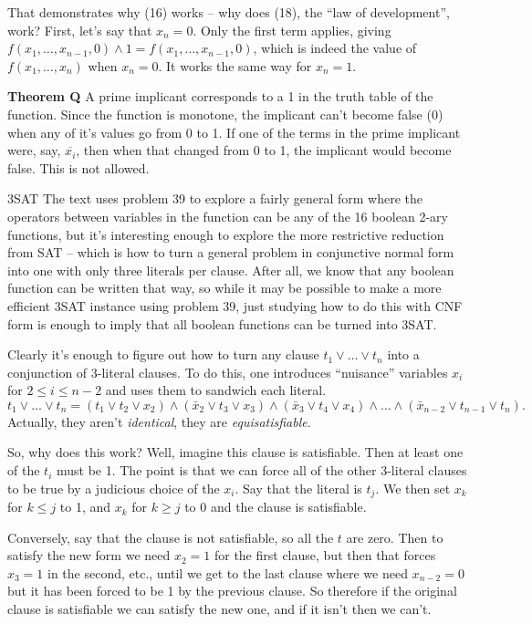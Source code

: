  That demonstrates why (16) works -- why does (18), 
the ``law of development'', work?\hfil\break
First, let's say that $x_n = 0$.  Only the first term applies, giving
$f\left(x_1,\ldots,x_{n-1},0\right) \wedge 1 = f\left(x_1,\ldots,x_{n-1},0\right)$,
which is indeed the value of $f\left( x_1,\ldots,x_n \right)$ when $x_n = 0$.
It works the same way for $x_n = 1$.

 {\bf Theorem Q}\hfil\break 
A prime implicant corresponds to a 1 in the
truth table of the function.  Since the function is monotone, the implicant
can't become false (0) when any of it's values go from 0 to 1.  If one
of the terms in the prime implicant were, say, $\overline{x_i}$, then
when that changed from 0 to 1, the implicant would become false.  This
is not allowed.


\noindent [p56] 3SAT\hfil\break
The text uses problem 39 to explore a fairly general form where the 
operators between variables
in the function can be any of the 16 boolean 2-ary functions, but it's
interesting enough to explore the more restrictive reduction from SAT --
which is how to turn a general problem in conjunctive normal form
into one with only three literals per clause.  After all, we know that
any boolean function can be written that way, so while it may be
possible to make a more efficient 3SAT instance using problem 39,
just studying how to do this with CNF form is enough to imply that
all boolean functions can be turned into 3SAT.

Clearly it's enough to figure out how to turn any clause $t_1 \vee \ldots
\vee t_n$ into a conjunction of 3-literal clauses.  To do this, one introduces
``nuisance'' variables $x_i$ for $2 \leq i \leq n - 2$ and uses them to sandwich
each literal.
$$
t_1 \vee \ldots \vee t_n = \left(t_1 \vee t_2 \vee x_2\right)
\land \left(\bar x_2 \vee t_3 \vee x_3\right)
\land \left(\bar x_3 \vee t_4 \vee x_4\right)
\land \ldots \land \left(\bar x_{n-2} \vee t_{n-1} \vee t_n\right) .
$$
Actually, they aren't {\it identical}, they are {\it equisatisfiable}.

So, why does this work?  Well, imagine this clause is satisfiable.
Then at least one of the $t_i$ must be 1. 
The point is that we can force all of the other 3-literal clauses
to be true by a judicious choice of the $x_i$.   Say that the
literal is $t_j$.  We then set $x_k$ for $k \le j$ to 1,
and $x_k$ for $k \geq j$ to 0 and the clause is satisfiable.

Conversely, say that the clause is not satisfiable, so all the $t$
are zero.  Then to satisfy the new form we need $x_2 = 1$ for
the first clause, but then that forces $x_3 = 1$ in the second,
etc., until we get to the last clause where we need $x_{n-2} = 0$
but it has been forced to be 1 by the previous clause.  So therefore
if the original clause is satisfiable we can satisfy the new one, and
if it isn't then we can't.

